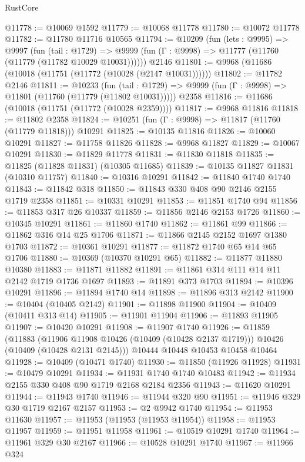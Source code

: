 \begin{lexlean}{RustCore}
\begin{coremodule}
@11778 := @10069 @1592
@11779 := @10068 @11778
@11780 := @10072 @11778
@11782 := @11780 @11716 @10565
@11794 := @10209
    (fun (lets : @9995) =>
    @9997
      (fun (tail : @1729) =>
      @9999 (fun (Γ : @9998) => @11777 (@11760 (@11779 (@11782 @10029 @10031))))))
    @2146
@11801 := @9968 (@11686 (@10018 (@11751 (@11772 (@10028 (@2147 @10031))))))
@11802 := @11782 @2146
@11811 := @10233
    (fun (tail : @1729) => @9999 (fun (Γ : @9998) => @11801 (@11760 (@11779 (@11802 @10031)))))
    @2358
@11816 := @11686 (@10018 (@11751 (@11772 (@10028 @2359))))
@11817 := @9968 @11816
@11818 := @11802 @2358
@11824 := @10251 (fun (Γ : @9998) => @11817 (@11760 (@11779 @11818))) @10291
@11825 := @10135 @11816
@11826 := @10060 @10291
@11827 := @11758 @11826
@11828 := @9968 @11827
@11829 := @10067 @10291
@11830 := @11829 @11778
@11831 := @11830 @11818
@11835 := @11825 (@11828 @11831) (@10305 @11685)
@11839 := @10135 @11827 @11831 (@10310 @11757)
@11840 := @10316 @10291
@11842 := @11840 @1740 @1740
@11843 := @11842 @318
@11850 := @11843 @330 @408 @90 @2146 @2155 @1719 @2358
@11851 := @10331 @10291
@11853 := @11851 @1740 @94
@11856 := @11853 @317 @26 @10337
@11859 := @11856 @2146 @2153 @1726
@11860 := @10345 @10291
@11861 := @11860 @1740
@11862 := @11861 @99
@11866 := @11862 @316 @14 @25 @1706
@11871 := @11866 @2145 @2152 @1697 @1380 @1703
@11872 := @10361 @10291
@11877 := @11872 @1740 @65 @14 @65 @1706
@11880 := @10369 (@10370 @10291 @65)
@11882 := @11877 @11880 @10380
@11883 := @11871 @11882
@11891 := @11861 @314 @111 @14 @11 @2142 @1719 @1736 @1697
@11893 := @11891 @373 @1703
@11894 := @10396 @10291
@11896 := @11894 @1740 @14
@11898 := @11896 @313 @2142
@11900 := @10404 (@10405 @2142)
@11901 := @11898 @11900
@11904 := @10409 (@10411 @313 @14)
@11905 := @11901 @11904
@11906 := @11893 @11905
@11907 := @10420 @10291
@11908 := @11907 @1740
@11926 := @11859
    (@11883
      (@11906 @11908 @10426 (@10409 (@10428 @2137 @1719)))
      @10426
      (@10409 (@10428 @2131 @2145)))
    @10444
    @10448
    @10453
    @10458
    @10464
@11928 := @10409 (@10471 @1740)
@11930 := @11850 (@11926 @11928)
@11931 := @10479 @10291
@11934 := @11931 @1740 @1740 @10483
@11942 := @11934 @2155 @330 @408 @90 @1719 @2168 @2184 @2356
@11943 := @11620 @10291
@11944 := @11943 @1740
@11946 := @11944 @320 @90
@11951 := @11946 @329 @30 @1719 @2167 @2157
@11953 := @2 @9942 @1740
@11954 := @11953 @11630
@11957 := @11953 (@11953 (@11953 @11954))
@11958 := @11953 @11957
@11959 := @11951 @11958
@11961 := @10519 @10291 @1740
@11964 := @11961 @329 @30 @2167
@11966 := @10528 @10291 @1740
@11967 := @11966 @324

\end{coremodule}
\end{lexlean}
